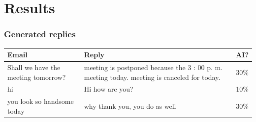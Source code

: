 \documentclass{beamer}
\begin{document}
\section{Results}

\begin{frame}
  \frametitle{Generated replies}

  \begin{table}
    \centering
    \begin{tabularx}{\textwidth}{|X|X|c|}
      \hline
      \textbf{Email}                      & \textbf{Reply}                                                                              & \textbf{AI?} \\
      \hline
      Shall we have the meeting tomorrow? & meeting is postponed because the 3 : 00 p. m. meeting today. meeting is canceled for today. & \num{30}{\%} \\
      \hline
      hi                                  & Hi how are you?                                                                             & \num{10}{\%} \\
      \hline
      you look so handsome today          & why thank you, you do as well                                                               & \num{30}{\%} \\
      \hline
    \end{tabularx}
  \end{table}
\end{frame}
\end{document}
